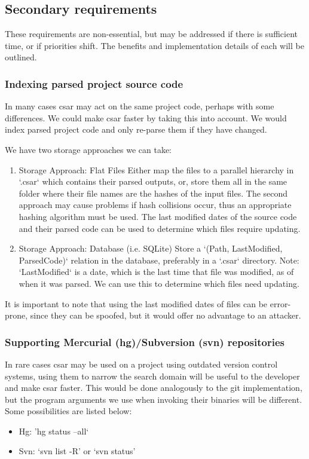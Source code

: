 \documentclass[12pt, letterpaper]{article}
\begin{document}
\subsection{Secondary requirements}
These requirements are non-essential, but may be addressed if there is sufficient time, or if priorities shift.
The benefits and implementation details of each will be outlined.

\subsubsection{Indexing parsed project source code}
In many cases csar may act on the same project code, perhaps with some differences.
We could make csar faster by taking this into account.
We would index parsed project code and only re-parse them if they have changed.

We have two storage approaches we can take:
\begin{enumerate}
  \item Storage Approach: Flat Files\newline
  Either map the files to a parallel hierarchy in `.csar` which contains their parsed outputs, or, store them all in the same folder where their file names are the hashes of the input files.
  The second approach may cause problems if hash collisions occur, thus an appropriate hashing algorithm must be used.
  The last modified dates of the source code and their parsed code can be used to determine which files require updating.
  \item Storage Approach: Database (i.e. SQLite)\newline
  Store a `(Path, LastModified, ParsedCode)` relation in the database, preferably in a `.csar` directory.
  Note: `LastModified` is a date, which is the last time that file was modified, as of when it was parsed.
  We can use this to determine which files need updating.
\end{enumerate}

It is important to note that using the last modified dates of files can be error-prone, since they can be spoofed, but it would offer no advantage to an attacker.

\subsubsection{Supporting Mercurial (hg)/Subversion (svn) repositories}
In rare cases csar may be used on a project using outdated version control systems, using them to narrow the search domain will be useful to the developer and make csar faster.
This would be done analogously to the git implementation, but the program arguments we use when invoking their binaries will be different.
Some possibilities are listed below:
\begin{itemize}
  \item Hg: 'hg status --all`
  \item Svn: `svn list -R' or `svn status'
\end{itemize}
\end{document}
